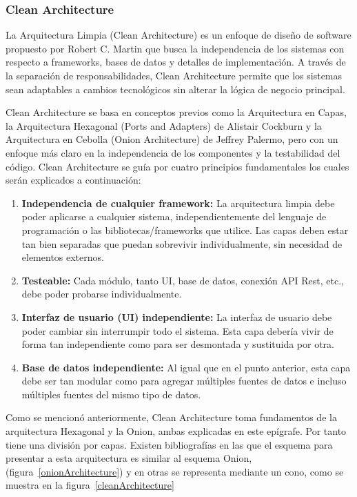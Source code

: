 \subsubsection{Clean Architecture}
La Arquitectura Limpia (Clean Architecture) es un enfoque de dise\~no de software propuesto
por Robert C. Martin que busca la independencia de los sistemas con respecto a frameworks,
bases de datos y detalles de implementaci\'on\cite{cleanArchitecture}. A través de la separación 
de responsabilidades, Clean Architecture permite que los sistemas sean adaptables a 
cambios tecnológicos sin alterar la lógica de negocio principal. 

Clean Architecture se basa en conceptos previos como la Arquitectura en Capas, 
la Arquitectura Hexagonal (Ports and Adapters) de Alistair Cockburn y la Arquitectura en 
Cebolla (Onion Architecture) de Jeffrey Palermo, pero con un enfoque más claro en la 
independencia de los componentes y la testabilidad del código. Clean Architecture
se gu\'ia por cuatro principios fundamentales\cite{cleanArchitecturePrincipios} los cuales
ser\'an explicados a continuaci\'on:

\begin{enumerate}
    \item \textbf{Independencia de cualquier framework:} La arquitectura limpia debe poder aplicarse a cualquier sistema, independientemente del lenguaje de programación o las bibliotecas/frameworks que utilice. Las capas deben estar tan bien separadas que puedan sobrevivir individualmente, sin necesidad de elementos externos.
    \item \textbf{Testeable:} Cada módulo, tanto UI, base de datos, conexión API Rest, etc., debe poder probarse individualmente.
    \item \textbf{Interfaz de usuario (UI) independiente:} La interfaz de usuario debe poder cambiar sin interrumpir todo el sistema. Esta capa debería vivir de forma tan independiente como para ser desmontada y sustituida por otra.
    \item \textbf{Base de datos independiente:} Al igual que en el punto anterior, esta capa debe ser tan modular como para agregar múltiples fuentes de datos e incluso múltiples fuentes del mismo tipo de datos.
\end{enumerate}

Como se mencion\'o anteriormente, Clean Architecture toma fundamentos de la arquitectura
Hexagonal y la Onion, ambas explicadas en este ep\'igrafe. Por tanto tiene una divisi\'on
por capas. Existen bibliograf\'ias en las que el esquema para presentar a esta arquitectura
es similar al esquema Onion, (figura~\ref{onionArchitecture}) y en otras se representa mediante
un cono, como se muestra en la figura~\ref{cleanArchitecture}

